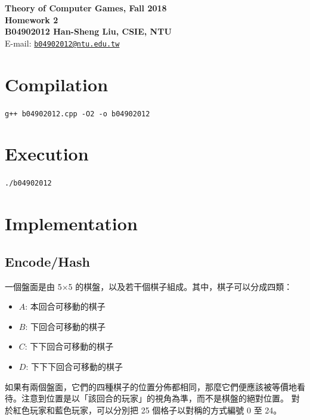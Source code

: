 \documentclass[12pt,a4paper]{article}
\begin{document}
\begin{center}
\textbf{\Large Theory of Computer Games, Fall 2018\\}
\textbf{\Large Homework 2\\} 
\vspace{5pt}
\textbf{B04902012 Han-Sheng Liu, CSIE, NTU}\\
E-mail: \href{mailto:b04902012@ntu.edu.tw}{\texttt{b04902012@ntu.edu.tw}}\\

\end{center}
\vspace{5pt}
\section{Compilation}
\texttt{g++ b04902012.cpp -O2 -o b04902012}
\section{Execution}
\lstinline{./b04902012}
\section{Implementation}
    \subsection{Encode/Hash}
        一個盤面是由 5$\times$5 的棋盤，以及若干個棋子組成。其中，棋子可以分成四類：
        \begin{itemize}
        \item \(A\): 本回合可移動的棋子
        \item \(B\): 下回合可移動的棋子
        \item \(C\): 下下回合可移動的棋子
        \item \(D\): 下下下回合可移動的棋子
        \end{itemize}
        如果有兩個盤面，它們的四種棋子的位置分佈都相同，那麼它們便應該被等價地看待。注意到位置是以「該回合的玩家」的視角為準，而不是棋盤的絕對位置。
        對於紅色玩家和藍色玩家，可以分別把 25 個格子以對稱的方式編號 0 至 24。
\end{document}
